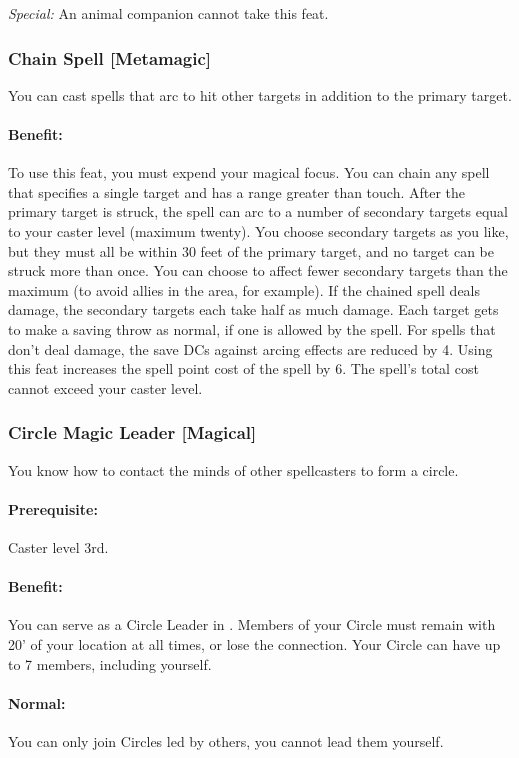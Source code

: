\emph{Special:} An animal companion cannot take this feat.
\subsubsection[Chain Spell]{Chain Spell [Metamagic]}
\label{Feat:ChainSpell}
You can cast spells that arc to hit other targets in addition to the primary target. 

\paragraph{Benefit:} To use this feat, you must expend your magical focus. 
You can chain any spell that specifies a single target and has a range greater than touch. 
After the primary target is struck, the spell can arc to a number of secondary targets equal to your caster level (maximum twenty).
You choose secondary targets as you like, but they must all be within 30 feet of the primary target, and no target can be struck more than once. 
You can choose to affect fewer secondary targets than the maximum (to avoid allies in the area, for example).
If the chained spell deals damage, the secondary targets each take half as much damage. 
Each target gets to make a saving throw as normal, if one is allowed by the spell. 
For spells that don't deal damage, the save DCs against arcing effects are reduced by 4.
Using this feat increases the spell point cost of the spell by 6. The spell's total cost cannot exceed your caster level.
\subsubsection[Circle Magic Leader]{Circle Magic Leader [Magical]}
\label{Feat:CircleMagicLeader}
You know how to contact the minds of other spellcasters to form a circle.
\paragraph{Prerequisite:} Caster level 3rd.
\paragraph{Benefit:} You can serve as a Circle Leader in . Members of your Circle must remain with 20' of your location at all times, or lose the connection. Your Circle can have up to 7 members, including yourself.
\paragraph{Normal:} You can only join Circles led by others, you cannot lead them yourself.
